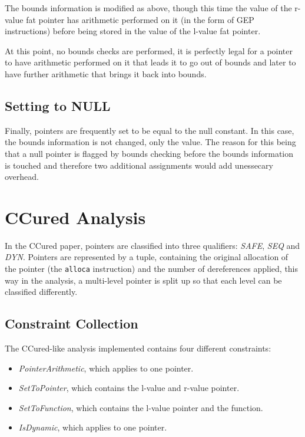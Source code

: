 The bounds information is modified as above, though this time the value of the r-value fat pointer has arithmetic performed on it (in the form of GEP instructions) before being stored in the value of the l-value fat pointer.

At this point, no bounds checks are performed, it is perfectly legal for a pointer to have arithmetic performed on it that leads it to go out of bounds and later to have further arithmetic that brings it back into bounds.

\subsection{Setting to NULL}

Finally, pointers are frequently set to be equal to the null constant.
In this case, the bounds information is not changed, only the value.
The reason for this being that a null pointer is flagged by bounds checking before the bounds information is touched and therefore two additional assignments would add unessecary overhead.

\section{CCured Analysis}

In the CCured paper, pointers are classified into three qualifiers: \textit{SAFE}, \textit{SEQ} and \textit{DYN}.
Pointers are represented by a tuple, containing the original allocation of the pointer (the \verb!alloca! instruction) and the number of dereferences applied, this way in the analysis, a multi-level pointer is split up so that each level can be classified differently.

\subsection{Constraint Collection}

The CCured-like analysis implemented contains four different constraints:
\begin{itemize}
\item \textit{PointerArithmetic}, which applies to one pointer.
\item \textit{SetToPointer}, which contains the l-value and r-value pointer.
\item \textit{SetToFunction}, which contains the l-value pointer and the function.
\item \textit{IsDynamic}, which applies to one pointer.
\end{itemize}

